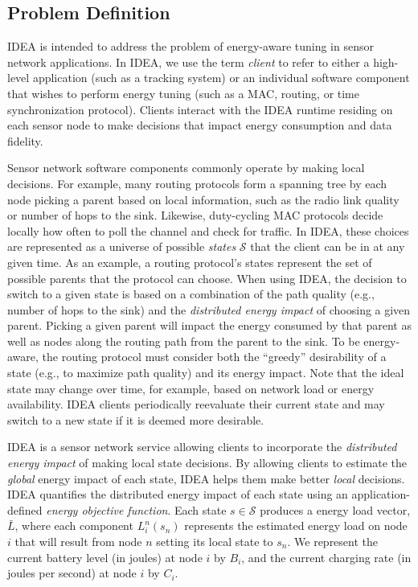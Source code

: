 \subsection{Problem Definition}

IDEA is intended to address the problem of energy-aware tuning in sensor
network applications. In IDEA, we use the term \textit{client} to refer to
either a high-level application (such as a tracking system) or an individual
software component that wishes to perform energy tuning (such as a MAC,
routing, or time synchronization protocol). Clients interact with the IDEA
runtime residing on each sensor node to make decisions that impact energy
consumption and data fidelity.

Sensor network software components commonly operate by making local
decisions. For example, many routing protocols form a spanning tree by each
node picking a parent based on local information, such as the radio link
quality or number of hops to the sink. Likewise, duty-cycling MAC protocols
decide locally how often to poll the channel and check for traffic. In IDEA,
these choices are represented as a universe of possible \textit{states}
$\mathcal{S}$ that the client can be in at any given time. As an example, a
routing protocol's states represent the set of possible parents that the
protocol can choose. When using IDEA, the decision to switch to a given state
is based on a combination of the path quality (e.g., number of hops to the
sink) and the \textit{distributed energy impact} of choosing a given parent.
Picking a given parent will impact the energy consumed by that parent as well
as nodes along the routing path from the parent to the sink. To be
energy-aware, the routing protocol must consider both the ``greedy''
desirability of a state (e.g., to maximize path quality) and its energy
impact. Note that the ideal state may change over time, for example, based on
network load or energy availability. IDEA clients periodically reevaluate
their current state and may switch to a new state if it is deemed more
desirable.

IDEA is a sensor network service allowing clients to incorporate the {\em
distributed energy impact} of making local state decisions. By allowing
clients to estimate the \textit{global} energy impact of each state, IDEA
helps them make better \textit{local} decisions. IDEA quantifies the
distributed energy impact of each state using an application-defined
\textit{energy objective function}. Each state $s \in \mathcal{S}$ produces a
energy load vector, $\bar{L}$, where each component $L_i^n(s_n)$ represents
the estimated energy load on node $i$ that will result from node $n$ setting
its local state to $s_n$. We represent the current battery level (in joules)
at node $i$ by $B_i$, and the current charging rate (in joules per second) at
node $i$ by $C_i$.

